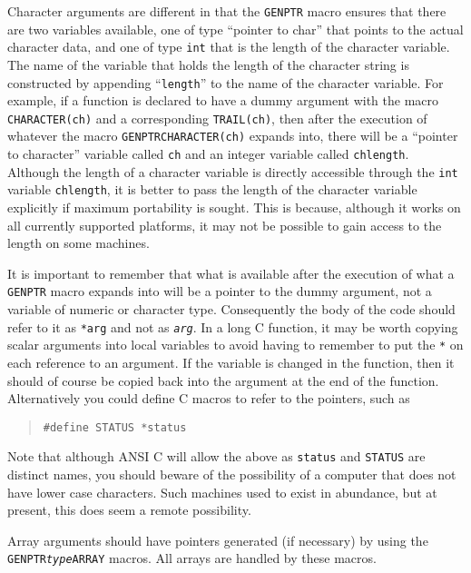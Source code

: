 \documentclass[twoside,11pt]{article}
\newcommand{\htmlref}[2]{#1}
\renewcommand{\_}{\texttt{\symbol{95}}}
\begin{document}
Character arguments are different in that the \texttt{GENPTR} macro ensures that
there are two variables available, one of type ``pointer to char'' that points 
to the actual character data, and one of type \texttt{int} that is the length
of the character variable. 
The name of the variable that holds the length of the
character string is constructed by appending ``\texttt{\_length}'' to the name
of the character variable. 
For example, if a function is declared to have a dummy
argument with the macro \texttt{CHARACTER(ch)} and a corresponding 
\texttt{TRAIL(ch)}, then after the execution of whatever the macro 
\texttt{GENPTR\_CHARACTER(ch)} expands into, there will be a ``pointer to 
character'' variable called \texttt{ch} and an integer variable called 
\texttt{ch\_length}.
Although the length of a character variable is directly accessible through the
\texttt{int} variable \texttt{ch\_length}, it is better to pass the length of 
the character variable explicitly if maximum portability is sought. This is
because, although it works on all currently supported platforms, it may not be
possible to gain access to the length on some machines.

It is important to remember that what is available after the execution of what
a \texttt{GENPTR} macro expands into will be a pointer to the dummy argument, 
not a variable of numeric or character type. Consequently the body of the code 
should refer to it as \texttt{*\texttt{arg}}\/ and not as 
\texttt{\textit{arg}}. 
In a long C function, it
may be worth copying scalar arguments into local variables to avoid having to
remember to put the \texttt{*} on each reference to an argument. If the variable
is changed in the function, then it should of course be copied back into the
argument at the end of the function. Alternatively you could define C macros to
refer to the pointers, such as

\begin{quote}
\texttt{\#define STATUS *status}
\end{quote}

Note that although ANSI C will allow the above as \texttt{status} and 
\texttt{STATUS}
are distinct names, you should beware of the possibility of a computer that
does not have lower case characters. Such machines used to exist in abundance,
but at present, this does seem a remote possibility.

Array arguments should have pointers generated (if necessary) by using the 
\htmlref{\texttt{GENPTR\_\-\textit{type}\_\-ARRAY}}{GENPTR_type_ARRAY}
macros. All arrays are handled by these macros.
\end{document}
